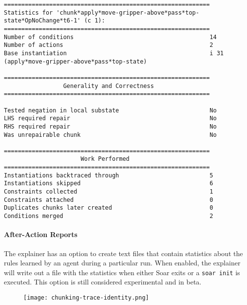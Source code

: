 {\scriptsize
\begin{verbatim}
===========================================================
Statistics for 'chunk*apply*move-gripper-above*pass*top-state*OpNoChange*t6-1' (c 1):
===========================================================
Number of conditions                                       14
Number of actions                                          2
Base instantiation                                         i 31 (apply*move-gripper-above*pass*top-state)

===========================================================
                 Generality and Correctness
===========================================================

Tested negation in local substate                          No
LHS required repair                                        No
RHS required repair                                        No
Was unrepairable chunk                                     No

===========================================================
                      Work Performed
===========================================================
Instantiations backtraced through                          5
Instantiations skipped                                     6
Constraints collected                                      1
Constraints attached                                       0
Duplicates chunks later created                            0
Conditions merged                                          2
\end{verbatim}
}

\paragraph{After-Action Reports}

The explainer has an option to create text files that contain statistics
about the rules learned by an agent during a particular run. When
enabled, the explainer will write out a file with the statistics when
either Soar exits or a \texttt{soar\ init} is executed. This option is
still considered experimental and in beta.


\begin{figure}[!ht]
	\centering
	\texttt{[image: chunking-trace-identity.png]}
	\label{fig:chunking-viz-identity}
\end{figure}

